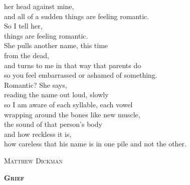\documentclass[10pt]{memoir}
\begin{document}
\begin{multicols}{2}
{her head against mine,\\
and all of a sudden things are feeling romantic.\\
So I tell her,\\
things are feeling romantic.\\
She pulls another name, this time\\
from the dead,\\
and turns to me in that way that parents do\\
so you feel embarrassed or ashamed of something.\\
Romantic? She says,\\
reading the name out loud, slowly\\
so I am aware of each syllable, each vowel\\
wrapping around the bones like new muscle,\\
the sound of that person's body\\
and how reckless it is,\\
how careless that his name is in one pile and not the other.
}

\vspace{11pt}
\hspace{44pt} \textsc{Matthew Dickman}\\

\vfill


\textbf{\textsc{\Large Grief}}
\vspace{18pt}


\end{multicols}
\end{document}
